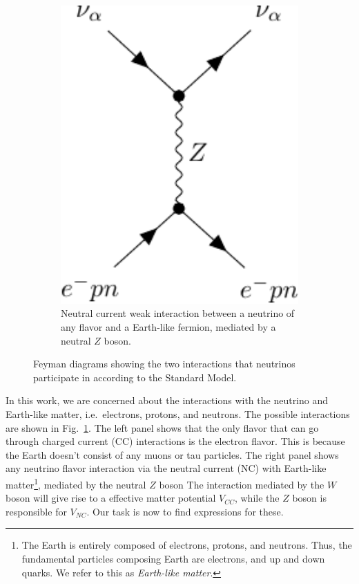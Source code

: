 \begin{figure}
\begin{subfigure}{0.3\textwidth}
        \includegraphics[width=1\textwidth]{figures/z-boson.pdf} 
        \caption{Neutral current weak interaction between a neutrino of any flavor and a Earth-like fermion,
        mediated by a neutral $Z$ boson.}
    \end{subfigure}%
    \caption{Feyman diagrams showing the two interactions that neutrinos participate in according to the Standard Model.}\label{fig:w_and_z}
\end{figure}
In this work, we are concerned about the interactions with the neutrino and Earth-like matter, i.e.~electrons, protons, and neutrons. 
The possible interactions are shown in Fig.~\ref{fig:w_and_z}. The left panel shows that the only flavor that can go through charged current (CC) 
interactions is the electron flavor. This is because the Earth doesn't consist of any muons or tau particles. 
The right panel shows any neutrino flavor interaction via the neutral current (NC) with Earth-like matter\footnote{The Earth is entirely composed
of electrons, protons, and neutrons. Thus, the fundamental particles composing Earth are electrons, and up and down quarks. We refer to this as \emph{Earth-like matter}.}, mediated by the neutral $Z$ boson
The interaction mediated by the $W$ boson will give rise to a effective matter potential $V_{CC}$, while
the $Z$ boson is responsible for $V_{NC}$. Our task is now to find expressions for these.

